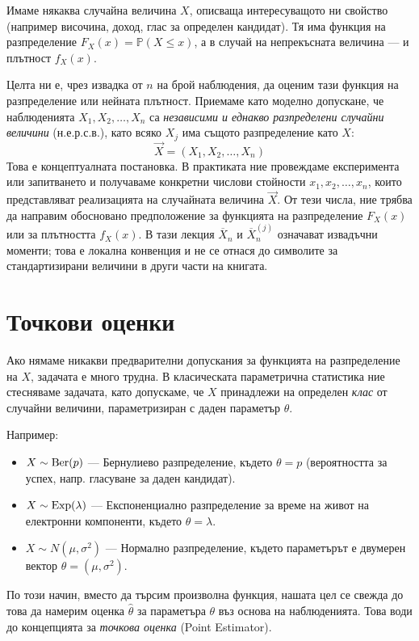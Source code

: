 Имаме някаква случайна величина $X$, описваща интересуващото ни свойство (например височина, доход, глас за определен кандидат). Тя има функция на разпределение $F_X(x) = \mathbb{P}(X \le x)$, а в случай на непрекъсната величина — и плътност $f_X(x)$.

Целта ни е, чрез извадка от $n$ на брой наблюдения, да оценим тази функция на разпределение или нейната плътност. Приемаме като моделно допускане, че наблюденията $X_1, X_2, \dots, X_n$ са \emph{независими и еднакво разпределени случайни величини} (н.е.р.с.в.), като всяко $X_j$ има същото разпределение като $X$:
\[
    \vec{X} = (X_1, X_2, \dots, X_n)
\]
Това е концептуалната постановка. В практиката ние провеждаме експеримента или запитването и получаваме конкретни числови стойности $x_1, x_2, \dots, x_n$, които представляват реализацията на случайната величина $\vec{X}$. От тези числа, ние трябва да направим обосновано предположение за функцията на разпределение $F_X(x)$ или за плътността $f_X(x)$. В тази лекция $\overline{X}_n$ и $\overline{X}_n^{(j)}$ означават извадъчни моменти; това е локална конвенция и не се отнася до символите за стандартизирани величини в други части на книгата.

\section{Точкови оценки}

Ако нямаме никакви предварителни допускания за функцията на разпределение на $X$, задачата е много трудна. В класическата параметрична статистика ние стесняваме задачата, като допускаме, че $X$ принадлежи на определен \emph{клас} от случайни величини, параметризиран с даден параметър $\theta$.

Например:
\begin{itemize}
    \item $X \sim \operatorname{Ber}(p)$ — Бернулиево разпределение, където $\theta = p$ (вероятността за успех, напр. гласуване за даден кандидат).
    \item $X \sim \operatorname{Exp}(\lambda)$ — Експоненциално разпределение за време на живот на електронни компоненти, където $\theta = \lambda$.
    \item $X \sim N(\mu, \sigma^2)$ — Нормално разпределение, където параметърът е двумерен вектор $\theta = (\mu, \sigma^2)$.
\end{itemize}

По този начин, вместо да търсим произволна функция, нашата цел се свежда до това да намерим оценка $\hat{\theta}$ за параметъра $\theta$ въз основа на наблюденията. Това води до концепцията за \emph{точкова оценка} (Point Estimator).

